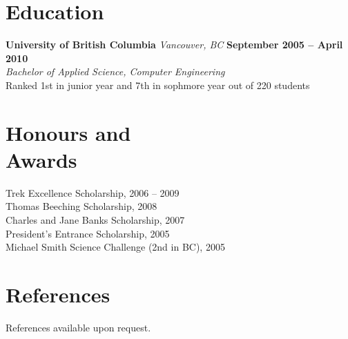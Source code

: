 \documentclass[margin,line]{resume}
\begin{document}
\begin{resume}
	\section{\mysidestyle Education}

	\textbf{University of British Columbia}
		\textsl{ Vancouver, BC}
		\hfill \textbf{September 2005 -- April 2010}
		\vspace{2mm}\\\vspace{1mm}%
	\textsl{Bachelor of Applied Science, Computer Engineering}
		\vspace{1mm}\\
	Ranked 1st in junior year and 7th in sophmore year out of 220 students

	\section{\mysidestyle Honours and\\Awards}

	Trek Excellence Scholarship, 2006 -- 2009
		\vspace{1mm}\\%
	Thomas Beeching Scholarship, 2008
		\vspace{1mm}\\%
	Charles and Jane Banks Scholarship, 2007
		\vspace{1mm}\\%
	President's Entrance Scholarship, 2005
		\vspace{1mm}\\%
	Michael Smith Science Challenge (2nd in BC), 2005

	\section{\mysidestyle References}
	References available upon request.


\end{resume}
\end{document}
